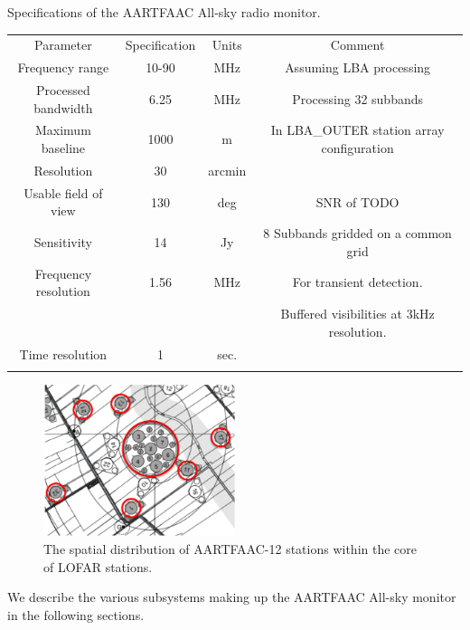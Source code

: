 \documentclass{ws-jai}
\begin{document}
\begin{wstable}[h]
\caption{Specifications of the AARTFAAC All-sky radio monitor.}
\begin{tabular}{@{}cccc@{}} \toprule
Parameter & Specification & Units & Comment\\ \colrule
Frequency range & 10-90 & MHz & Assuming LBA processing  \\
Processed bandwidth & 6.25 & MHz & Processing 32 subbands \\
Maximum baseline & 1000 & m & In LBA\_OUTER station array configuration\\
Resolution & 30 & arcmin & \\
Usable field of view & 130 & deg & SNR of TODO \\
Sensitivity & 14 & Jy & 8 Subbands gridded on a common grid \\
Frequency resolution & 1.56 & MHz & For transient detection. \\
 & & & Buffered visibilities at 3kHz resolution.\\
Time resolution & 1 & sec.\\ \colrule

\end{tabular}
\label{tab:afaac_specs}
\end{wstable}

\begin{figure}[htbp]
\includegraphics[width=0.5\textwidth]{Figs/afaac12_arrayconfig.png}
\caption{The spatial distribution of AARTFAAC-12 stations within the core of LOFAR stations.}
\label{fig:afaac12_arrayconfig}
\end{figure}


We describe the various subsystems making up the AARTFAAC All-sky monitor in the
following sections.
\end{document}
